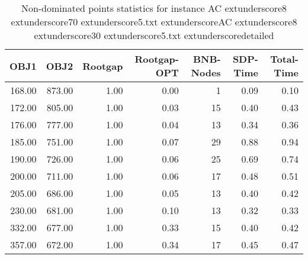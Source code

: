 \begin{table}
\caption{Non-dominated points statistics for instance AC	extunderscore8	extunderscore70	extunderscore5.txt	extunderscoreAC	extunderscore8	extunderscore30	extunderscore5.txt	extunderscoredetailed}
\label{tab:plots/AC_8_70_5.txt_AC_8_30_5.txt_detailed}
\begin{tabular}{rrrrrrr}
\toprule
OBJ1 & OBJ2 & Rootgap & Rootgap-OPT & BNB-Nodes & SDP-Time & Total-Time \\
\midrule
168.00 & 873.00 & 1.00 & 0.00 & 1 & 0.09 & 0.10 \\
172.00 & 805.00 & 1.00 & 0.03 & 15 & 0.40 & 0.43 \\
176.00 & 777.00 & 1.00 & 0.04 & 13 & 0.34 & 0.36 \\
185.00 & 751.00 & 1.00 & 0.07 & 29 & 0.88 & 0.94 \\
190.00 & 726.00 & 1.00 & 0.06 & 25 & 0.69 & 0.74 \\
200.00 & 711.00 & 1.00 & 0.06 & 17 & 0.48 & 0.51 \\
205.00 & 686.00 & 1.00 & 0.05 & 13 & 0.40 & 0.42 \\
230.00 & 681.00 & 1.00 & 0.10 & 13 & 0.32 & 0.33 \\
332.00 & 677.00 & 1.00 & 0.33 & 15 & 0.40 & 0.42 \\
357.00 & 672.00 & 1.00 & 0.34 & 17 & 0.45 & 0.47 \\
\bottomrule
\end{tabular}
\end{table}
